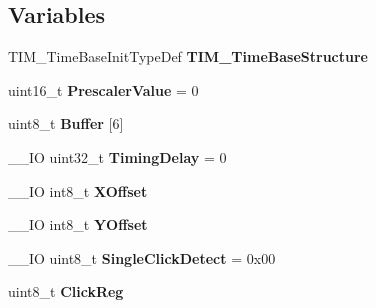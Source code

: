 \subsection*{Variables}
\begin{DoxyCompactItemize}
\item 
\hypertarget{group___l_i_s302_d_l___example_gad2b9d014ac15d04c276608d776531753}{T\-I\-M\-\_\-\-Time\-Base\-Init\-Type\-Def {\bfseries T\-I\-M\-\_\-\-Time\-Base\-Structure}}\label{group___l_i_s302_d_l___example_gad2b9d014ac15d04c276608d776531753}

\item 
\hypertarget{group___l_i_s302_d_l___example_ga926539c31db1b9beef91893c9e44fd20}{uint16\-\_\-t {\bfseries Prescaler\-Value} = 0}\label{group___l_i_s302_d_l___example_ga926539c31db1b9beef91893c9e44fd20}

\item 
\hypertarget{group___l_i_s302_d_l___example_ga6d95c1c4c5febd83c41e4f1e4ffafc72}{uint8\-\_\-t {\bfseries Buffer} \mbox{[}6\mbox{]}}\label{group___l_i_s302_d_l___example_ga6d95c1c4c5febd83c41e4f1e4ffafc72}

\item 
\hypertarget{group___l_i_s302_d_l___example_gaf484abe0ca156dc40cf0fb5e79d4d6db}{\-\_\-\-\_\-\-I\-O uint32\-\_\-t {\bfseries Timing\-Delay} = 0}\label{group___l_i_s302_d_l___example_gaf484abe0ca156dc40cf0fb5e79d4d6db}

\item 
\hypertarget{group___l_i_s302_d_l___example_ga65ae650a8f9852583e5115c6cef63564}{\-\_\-\-\_\-\-I\-O int8\-\_\-t {\bfseries X\-Offset}}\label{group___l_i_s302_d_l___example_ga65ae650a8f9852583e5115c6cef63564}

\item 
\hypertarget{group___l_i_s302_d_l___example_gaabec2e8b238c68bcf7a52f977a738f04}{\-\_\-\-\_\-\-I\-O int8\-\_\-t {\bfseries Y\-Offset}}\label{group___l_i_s302_d_l___example_gaabec2e8b238c68bcf7a52f977a738f04}

\item 
\hypertarget{group___l_i_s302_d_l___example_gadd1e9305c0bb616ee59a705531d11bee}{\-\_\-\-\_\-\-I\-O uint8\-\_\-t {\bfseries Single\-Click\-Detect} = 0x00}\label{group___l_i_s302_d_l___example_gadd1e9305c0bb616ee59a705531d11bee}

\item 
\hypertarget{group___l_i_s302_d_l___example_ga67299a22e2291ffc112aa828744f08ea}{uint8\-\_\-t {\bfseries Click\-Reg}}\label{group___l_i_s302_d_l___example_ga67299a22e2291ffc112aa828744f08ea}

\end{DoxyCompactItemize}


